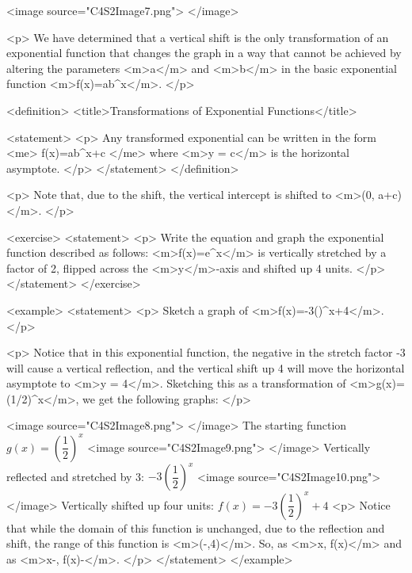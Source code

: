         <image source="C4S2Image7.png">
        </image>

        <p>
            We have determined that a vertical shift is the only transformation of an exponential function that changes the graph in a way that cannot be achieved by altering the parameters <m>a</m> and <m>b</m> in the basic exponential function <m>f(x)=ab^{x}</m>.
        </p>

        <definition>
            <title>Transformations of Exponential Functions</title>

            <statement>
                <p>
                    Any transformed exponential can be written in the form
                    <me>
                        f(x)=ab^{x}+c
                    </me>
                    where <m>y = c</m> is the horizontal asymptote.
                </p>
            </statement>
        </definition>

        <p>
            Note that, due to the shift, the vertical intercept is shifted to <m>(0, a+c)</m>.
        </p>

        <exercise>
            <statement>
                <p>
                    Write the equation and graph the exponential function described as follows: <m>f(x)=e^{x}</m> is vertically stretched by a factor of 2, flipped across the <m>y</m>-axis and shifted up 4 units.
                </p>
            </statement>
        </exercise>

        <example>
            <statement>
                <p>
                    Sketch a graph of <m>f(x)=-3()^{x}+4</m>.
                </p>

                <p>
                    Notice that in this exponential function, the negative in the stretch factor -3 will cause a vertical reflection, and the vertical shift up 4 will move the horizontal asymptote to <m>y = 4</m>.
                    Sketching this as a transformation of <m>g(x)=(1/2)^{x}</m>, we get the following graphs:
                </p>

                <image source="C4S2Image8.png">
                </image>
                The starting function $g(x)=(\dfrac{1}{2})^{x}$
                <image source="C4S2Image9.png">
                </image>
                Vertically reflected and stretched by 3: $-3(\dfrac{1}{2})^{x}$
                <image source="C4S2Image10.png">
                </image>
                Vertically shifted up four units: $f(x)=-3(\dfrac{1}{2})^{x}+4$
                <p>
                    Notice that while the domain of this function is unchanged, due to the reflection and shift, the range of this function is <m>(-\infty,4)</m>.
                    So, as <m>x\to\infty, f(x)</m> and as <m>x\to-\infty, f(x)\to-\infty</m>.
                </p>
            </statement>
        </example>

